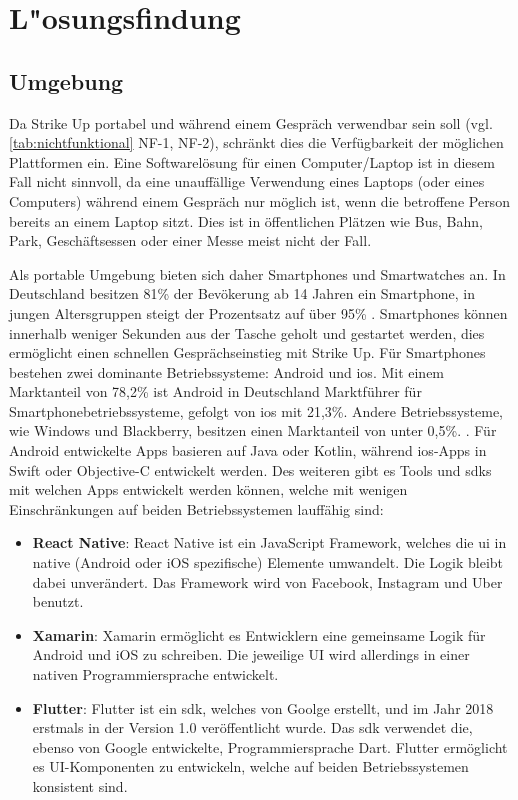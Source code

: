 \chapter{L"osungsfindung}
\label{ch:loesungsfindung}

\section{Umgebung}
\label{sec:umgebung}

Da Strike Up portabel und während einem Gespräch verwendbar sein soll (vgl. \ref{tab:nichtfunktional} NF-1, NF-2), schränkt dies die Verfügbarkeit der möglichen Plattformen ein. \newline
Eine Softwarelösung für einen Computer/Laptop ist in diesem Fall nicht sinnvoll, da eine unauffällige Verwendung eines Laptops (oder eines Computers) während einem Gespräch nur möglich ist, wenn die betroffene Person bereits an einem Laptop sitzt. Dies ist in öffentlichen Plätzen wie Bus, Bahn, Park, Geschäftsessen oder einer Messe meist nicht der Fall.

Als portable Umgebung bieten sich daher Smartphones und Smartwatches an. \newline
In Deutschland besitzen 81\% der Bevökerung ab 14 Jahren ein Smartphone, in jungen Altersgruppen steigt der Prozentsatz auf über 95\% \cite{misc:marktforschung_smartphone}. Smartphones können innerhalb weniger Sekunden aus der Tasche geholt und gestartet werden, dies ermöglicht einen schnellen Gesprächseinstieg mit Strike Up. \newline
Für Smartphones bestehen zwei dominante Betriebssysteme: Android und i\acrshort{os}. Mit einem Marktanteil von 78,2\% ist Android in Deutschland Marktführer für Smartphonebetriebssysteme, gefolgt von i\acrshort{os} mit 21,3\%. Andere Betriebssysteme, wie Windows und Blackberry, besitzen einen Marktanteil von unter 0,5\%. \cite{misc:kantarworldpanel}. \newline
Für Android entwickelte Apps basieren auf Java oder Kotlin, während i\acrshort{os}-Apps in Swift oder Objective-C entwickelt werden. Des weiteren gibt es Tools und \glspl{sdk} mit welchen Apps entwickelt werden können, welche mit wenigen Einschränkungen auf beiden Betriebssystemen lauffähig sind:
\begin{itemize}
    \item \textbf{React Native}: React Native ist ein JavaScript Framework, welches die \gls{ui} in native (Android oder iOS spezifische) Elemente umwandelt. Die Logik bleibt dabei unverändert. Das Framework wird von Facebook, Instagram und Uber benutzt.
    \item \textbf{Xamarin}: Xamarin ermöglicht es Entwicklern eine gemeinsame Logik für Android und iOS zu schreiben. Die jeweilige UI wird allerdings in einer nativen Programmiersprache entwickelt.
    \item \textbf{Flutter}: Flutter ist ein \gls{sdk}, welches von Goolge erstellt, und im Jahr 2018 erstmals in der Version 1.0 veröffentlicht wurde. Das \gls{sdk} verwendet die, ebenso von Google entwickelte, Programmiersprache Dart. Flutter ermöglicht es UI-Komponenten zu entwickeln, welche auf beiden Betriebssystemen konsistent sind.
\end{itemize}

